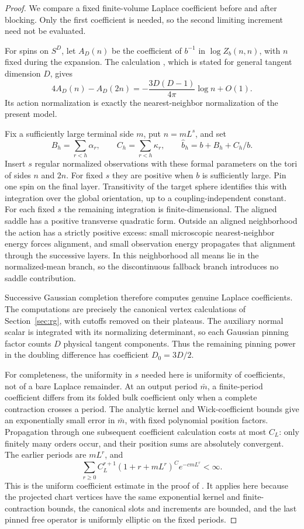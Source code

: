\begin{proof}
We compare a fixed finite-volume Laplace coefficient before and after
blocking. Only the first coefficient is needed, so the second limiting
increment need not be evaluated.

For spins on $S^D$, let $A_D(n)$ be the coefficient of $b^{-1}$ in
$\log Z_b(n,n)$, with $n$ fixed during the expansion. The calculation
, which is stated for general tangent dimension $D$,
gives
\begin{equation}
 4A_D(n)-A_D(2n)
   =-\frac{3D(D-1)}{4\pi}\log n+O(1).
 \label{eq:shooting-bare-coefficient}
\end{equation}
Its action normalization is exactly the nearest-neighbor normalization
of the present model.

Fix a sufficiently large terminal side $m$, put $n=mL^s$, and set
\[
 B_h=\sum_{r<h}\alpha_r,\qquad C_h=\sum_{r<h}\kappa_r,
 \qquad \widehat b_h=b+B_h+C_h/b.
\]
Insert $s$ regular normalized observations with these formal parameters
on the tori of sides $n$ and $2n$. For fixed $s$ they are positive when
$b$ is sufficiently large.
Pin one spin on the final layer. Transitivity of the target sphere
identifies this with integration over the global orientation, up to a
coupling-independent constant. For each fixed $s$ the remaining
integration is finite-dimensional. The aligned saddle has a positive
transverse quadratic form. Outside an aligned neighborhood the action
has a strictly positive excess: small microscopic nearest-neighbor
energy forces alignment, and small observation energy propagates that
alignment through the successive layers. In this neighborhood all
means lie in the normalized-mean branch, so the discontinuous fallback
branch introduces no saddle contribution.

Successive Gaussian completion therefore computes genuine Laplace
coefficients. The computations are precisely the canonical vertex
calculations of Section~\ref{sec:rg}, with cutoffs removed on their
plateaus. The auxiliary normal scalar is integrated with its
normalizing determinant, so each Gaussian pinning factor counts $D$
physical tangent components. Thus the remaining pinning power in the
doubling difference has coefficient $D_0=3D/2$.

For completeness, the uniformity in $s$ needed here is uniformity of
coefficients, not of a bare Laplace remainder. At an output period
$\bar m$, a finite-period coefficient differs from its folded bulk
coefficient only when a complete contraction crosses a period. The
analytic kernel and Wick-coefficient bounds give an exponentially
small error in $\bar m$, with fixed polynomial position factors.
Propagation through one subsequent coefficient calculation costs at
most $C_L$: only finitely many orders occur, and their position sums
are absolutely convergent. The earlier periods are $mL^r$, and
\[
 \sum_{r\ge0} C_L^{r+1}(1+r+mL^r)^C e^{-cmL^r}<\infty.
\]
This is the uniform coefficient estimate in the proof of
. It applies here because the projected chart vertices
have the same exponential kernel and finite-contraction bounds, the
canonical slots and increments are bounded, and the last pinned free
operator is uniformly elliptic on the fixed periods.


\end{proof}
